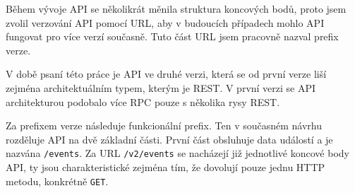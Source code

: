 Během vývoje API se několikrát měnila struktura koncových bodů, proto jsem zvolil verzování API pomocí URL, aby v budoucích případech mohlo API fungovat pro více verzí současně. Tuto část URL jsem pracovně nazval prefix verze.

V době psaní této práce je API ve druhé verzi, která se od první verze liší zejména architektuálním typem, kterým je REST. V první verzi se API architekturou podobalo více RPC pouze s několika rysy REST.

Za prefixem verze následuje funkcionální prefix. Ten v současném návrhu rozděluje API na dvě základní části. První část obsluhuje data událostí a je nazvána \texttt{/events}. Za URL \texttt{/v2/events} se nacházejí již jednotlivé koncové body API, ty jsou charakteristické zejména tím, že dovolují pouze jednu HTTP metodu, konkrétně \texttt{GET}.

